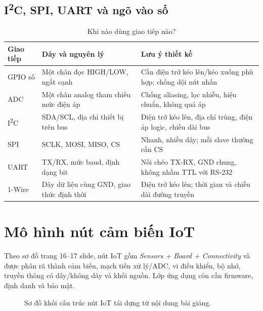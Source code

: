 \subsection{I\textsuperscript{2}C, SPI, UART và ngõ vào số}
\begin{table}[htbp]\centering\small
\caption{Khi nào dùng giao tiếp nào?}
\begin{tabularx}{\textwidth}{p{18mm}p{42mm}X}
\toprule
Giao tiếp & Dây và nguyên lý & Lưu ý thiết kế\\\midrule
GPIO số & Một chân đọc HIGH/LOW, ngắt cạnh & Cần điện trở kéo lên/kéo xuống phù hợp; chống dội nút nhấn\\
ADC & Một chân analog tham chiếu mức điện áp & Chống aliasing, lọc nhiễu, hiệu chuẩn, không quá áp\\
I\textsuperscript{2}C & SDA/SCL, địa chỉ thiết bị trên bus & Điện trở kéo lên, địa chỉ trùng, điện áp logic, chiều dài bus\\
SPI & SCLK, MOSI, MISO, CS & Nhanh, nhiều dây; mỗi slave thường cần CS\\
UART & TX/RX, mức baud, định dạng bit & Nối chéo TX-RX, GND chung, không nhầm TTL với RS-232\\
1-Wire & Dây dữ liệu cùng GND, giao thức định thời & Điện trở kéo lên; thời gian và chiều dài đường truyền\\\bottomrule
\end{tabularx}
\end{table}

\section{Mô hình nút cảm biến IoT}
Theo sơ đồ trang 16--17 slide, nút IoT gồm \emph{Sensors + Board + Connectivity} và được phân rã thành cảm biến, mạch tiền xử lý/ADC, vi điều khiển, bộ nhớ, truyền thông có dây/không dây và khối nguồn. Lớp ứng dụng còn cần firmware, định danh và bảo mật.

\begin{figure}[htbp]\centering
{}
\caption{Sơ đồ khối cấu trúc nút IoT tái dựng từ nội dung bài giảng.}
\end{figure}

